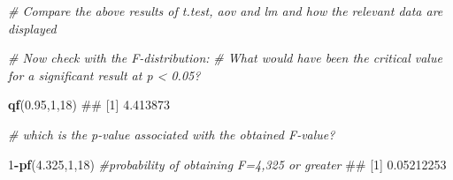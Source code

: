 \documentclass[]{book}
\newenvironment{Shaded}{\begin{snugshade}}{\end{snugshade}}
\newcommand{\KeywordTok}[1]{\textcolor[rgb]{0.13,0.29,0.53}{\textbf{#1}}}
\newcommand{\DataTypeTok}[1]{\textcolor[rgb]{0.13,0.29,0.53}{#1}}
\newcommand{\DecValTok}[1]{\textcolor[rgb]{0.00,0.00,0.81}{#1}}
\newcommand{\FloatTok}[1]{\textcolor[rgb]{0.00,0.00,0.81}{#1}}
\newcommand{\StringTok}[1]{\textcolor[rgb]{0.31,0.60,0.02}{#1}}
\newcommand{\CommentTok}[1]{\textcolor[rgb]{0.56,0.35,0.01}{\textit{#1}}}
\newcommand{\OperatorTok}[1]{\textcolor[rgb]{0.81,0.36,0.00}{\textbf{#1}}}
\newcommand{\NormalTok}[1]{#1}
\begin{document}
\begin{Shaded}
\begin{Highlighting}[]
\CommentTok{# Compare the above results of t.test, aov and lm and how the relevant data are displayed}

\CommentTok{# Now check with the F-distribution:}
\CommentTok{# What would have been the critical value for a significant result at p < 0.05?}

\KeywordTok{qf}\NormalTok{(}\FloatTok{0.95}\NormalTok{,}\DecValTok{1}\NormalTok{,}\DecValTok{18}\NormalTok{)}
\NormalTok{## [1] 4.413873}

\CommentTok{# which is the p-value associated with the obtained F-value?}

\DecValTok{1}\OperatorTok{-}\KeywordTok{pf}\NormalTok{(}\FloatTok{4.325}\NormalTok{,}\DecValTok{1}\NormalTok{,}\DecValTok{18}\NormalTok{) }\CommentTok{#probability of obtaining F=4,325 or greater}
\NormalTok{## [1] 0.05212253}
\end{Highlighting}
\end{Shaded}

\begin{Shaded}
\end{Shaded}
\end{document}
